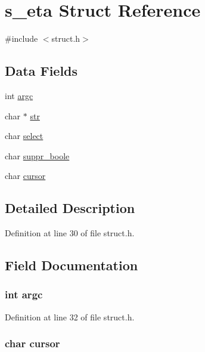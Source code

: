 \hypertarget{structs__eta}{\section{s\+\_\+eta Struct Reference}
\label{structs__eta}
}


{\ttfamily \#include $<$struct.\+h$>$}

\subsection*{Data Fields}
\begin{DoxyCompactItemize}
\item 
int \hyperlink{structs__eta_ad1447518f4372828b8435ae82e48499e}{argc}
\item 
char $\ast$ \hyperlink{structs__eta_ab50d783982593ef993ea0b68f7ad8b80}{str}
\item 
char \hyperlink{structs__eta_ad0f42f33c3ed3e4ff7ab6c1e5c3c2d63}{select}
\item 
char \hyperlink{structs__eta_a7f367aa2d6f5b1e190e121a380f8e683}{suppr\+\_\+boole}
\item 
char \hyperlink{structs__eta_a2dd5571b4843080dee9e9b455c446a86}{cursor}
\end{DoxyCompactItemize}


\subsection{Detailed Description}


Definition at line 30 of file struct.\+h.



\subsection{Field Documentation}
\hypertarget{structs__eta_ad1447518f4372828b8435ae82e48499e}{
\subsubsection[{argc}]{\setlength{\rightskip}{0pt plus 5cm}int argc}}\label{structs__eta_ad1447518f4372828b8435ae82e48499e}


Definition at line 32 of file struct.\+h.

\hypertarget{structs__eta_a2dd5571b4843080dee9e9b455c446a86}{
\subsubsection[{cursor}]{\setlength{\rightskip}{0pt plus 5cm}char cursor}}\label{structs__eta_a2dd5571b4843080dee9e9b455c446a86}


